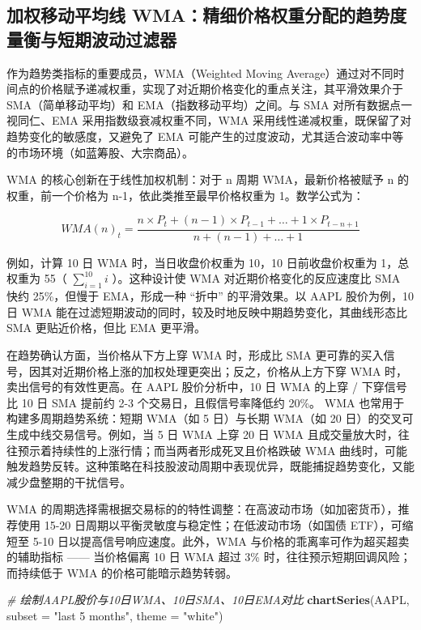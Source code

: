 \documentclass[]{ctexbook}
\newenvironment{Shaded}{\begin{snugshade}}{\end{snugshade}}
\newcommand{\AttributeTok}[1]{\textcolor[rgb]{0.13,0.29,0.53}{#1}}
\newcommand{\CommentTok}[1]{\textcolor[rgb]{0.56,0.35,0.01}{\textit{#1}}}
\newcommand{\FunctionTok}[1]{\textcolor[rgb]{0.13,0.29,0.53}{\textbf{#1}}}
\newcommand{\NormalTok}[1]{#1}
\newcommand{\StringTok}[1]{\textcolor[rgb]{0.31,0.60,0.02}{#1}}
\begin{document}
\subsection{加权移动平均线 WMA：精细价格权重分配的趋势度量衡与短期波动过滤器}\label{ux52a0ux6743ux79fbux52a8ux5e73ux5747ux7ebf-wmaux7cbeux7ec6ux4ef7ux683cux6743ux91cdux5206ux914dux7684ux8d8bux52bfux5ea6ux91cfux8861ux4e0eux77edux671fux6ce2ux52a8ux8fc7ux6ee4ux5668}

作为趋势类指标的重要成员，WMA（Weighted Moving Average）通过对不同时间点的价格赋予递减权重，实现了对近期价格变化的重点关注，其平滑效果介于 SMA（简单移动平均）和 EMA（指数移动平均）之间。与 SMA 对所有数据点一视同仁、EMA 采用指数级衰减权重不同，WMA 采用线性递减权重，既保留了对趋势变化的敏感度，又避免了 EMA 可能产生的过度波动，尤其适合波动率中等的市场环境（如蓝筹股、大宗商品）。

WMA 的核心创新在于线性加权机制：对于 n 周期 WMA，最新价格被赋予 n 的权重，前一个价格为 n-1，依此类推至最早价格权重为 1。数学公式为：

\[
WMA(n)_t = \frac{n \times P_t + (n-1) \times P_{t-1} + \dots + 1 \times P_{t-n+1}}{n + (n-1) + \dots + 1}
\]

例如，计算 10 日 WMA 时，当日收盘价权重为 10，10 日前收盘价权重为 1，总权重为 55（ \(\sum_{i=1}^{10} i\) ）。这种设计使 WMA 对近期价格变化的反应速度比 SMA 快约 25\%，但慢于 EMA，形成一种 ``折中'' 的平滑效果。以 AAPL 股价为例，10 日 WMA 能在过滤短期波动的同时，较及时地反映中期趋势变化，其曲线形态比 SMA 更贴近价格，但比 EMA 更平滑。

在趋势确认方面，当价格从下方上穿 WMA 时，形成比 SMA 更可靠的买入信号，因其对近期价格上涨的加权处理更突出；反之，价格从上方下穿 WMA 时，卖出信号的有效性更高。在 AAPL 股价分析中，10 日 WMA 的上穿 / 下穿信号比 10 日 SMA 提前约 2-3 个交易日，且假信号率降低约 20\%。
WMA 也常用于构建多周期趋势系统：短期 WMA（如 5 日）与长期 WMA（如 20 日）的交叉可生成中线交易信号。例如，当 5 日 WMA 上穿 20 日 WMA 且成交量放大时，往往预示着持续性的上涨行情；而当两者形成死叉且价格跌破 WMA 曲线时，可能触发趋势反转。这种策略在科技股波动周期中表现优异，既能捕捉趋势变化，又能减少盘整期的干扰信号。

WMA 的周期选择需根据交易标的的特性调整：在高波动市场（如加密货币），推荐使用 15-20 日周期以平衡灵敏度与稳定性；在低波动市场（如国债 ETF），可缩短至 5-10 日以提高信号响应速度。此外，WMA 与价格的乖离率可作为超买超卖的辅助指标 ------ 当价格偏离 10 日 WMA 超过 3\% 时，往往预示短期回调风险；而持续低于 WMA 的价格可能暗示趋势转弱。

\begin{Shaded}
\begin{Highlighting}[]
\CommentTok{\# 绘制AAPL股价与10日WMA、10日SMA、10日EMA对比}
\FunctionTok{chartSeries}\NormalTok{(AAPL, }\AttributeTok{subset =} \StringTok{"last 5 months"}\NormalTok{, }\AttributeTok{theme =} \StringTok{"white"}\NormalTok{)}
\end{Highlighting}
\end{Shaded}
\end{document}
